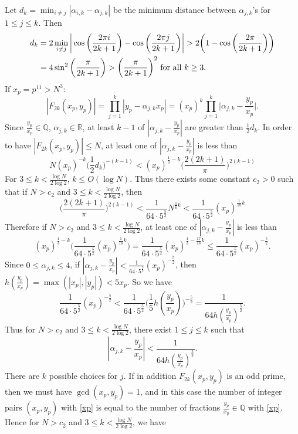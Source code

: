 \documentclass[12pt]{amsart}
\numberwithin{equation}{section}
\begin{document}
Let $d_k=\min_{i\neq j}|\alpha_{i,k}-\alpha_{j,k}|$ be the minimum distance between $\alpha_{j,k}$'s for $1\leq j\leq k$. Then \begin{displaymath}
\begin{split}
d_k&=2\min_{i\neq j}\bigg|\cos{\bigg(\frac{2\pi i}{2k+1}\bigg)}-\cos{\bigg(\frac{2\pi j}{2k+1}\bigg)}\bigg|>2\bigg(1-\cos{\bigg(\frac{2\pi}{2k+1}\bigg)}\bigg)\\&=4\sin^2{\bigg(\frac{\pi}{2k+1}\bigg)}>\bigg(\frac{\pi}{2k+1}\bigg)^2 \textup{ for all }k\geq 3.
\end{split}
\end{displaymath}
If $x_p=p^{11}>N^3$: $$|F_{2k}(x_p,y_p)|=\prod_{j=1}^k|y_p-\alpha_{j,k}x_p|=(x_p)^k\prod_{j=1}^k\bigg|\alpha_{j,k}-\frac{y_p}{x_p}\bigg|.$$
Since $\frac{y_p}{x_p}\in\mathbb{Q}$, $\alpha_{j,k}\in\mathbb{R}$, at least $k-1$ of $|\alpha_{j,k}-\frac{y_p}{x_p}|$ are greater than $\frac{1}{2}d_k$. In order to have $|F_{2k}(x_p,y_p)|\leq N$, at least one of $|\alpha_{j,k}-\frac{y_p}{x_p}|$ is less than $$N(x_p)^{-k}\bigg(\frac{1}{2}d_k\bigg)^{-(k-1)}<(x_p)^{\frac{1}{3}-k}\bigg(\frac{2(2k+1)}{\pi}\bigg)^{2(k-1)}$$
For $3\leq k<\frac{\log N}{2\log 2}$, $k\leq O(\log N)$. Thus there exists some constant $c_2>0$ such that if $N>c_2$ and $3\leq k < \frac{\log N}{2\log 2}$, then $$\bigg(\frac{2(2k+1)}{\pi}\bigg)^{2(k-1)}<\frac{1}{64\cdot5^{\frac{5}{2}}}N^{\frac{1}{6}k}<\frac{1}{64\cdot5^{\frac{5}{2}}}(x_p)^{\frac{1}{18}k}$$ 
Therefore if $N>c_2$ and $3\leq k < \frac{\log N}{2\log 2}$, at least one of $|\alpha_{j,k}-\frac{y_p}{x_p}|$ is less than $$(x_p)^{\frac{1}{3}-k}\bigg(\frac{1}{64\cdot5^{\frac{5}{2}}}(x_p)^{\frac{1}{18}k}\bigg)=\frac{1}{64\cdot5^{\frac{5}{2}}}(x_p)^{\frac{1}{3}-\frac{17}{18}k}\leq\frac{1}{64\cdot5^{\frac{5}{2}}}(x_p)^{-\frac{5}{2}}.$$
Since $0\leq \alpha_{j,k}\leq 4$, if $|\alpha_{j,k}-\frac{y_p}{x_p}|<\frac{1}{64\cdot5^{\frac{5}{2}}}(x_p)^{-\frac{5}{2}}$, then $h(\frac{y_p}{x_p})=\max(|x_p|,|y_p|)<5x_p$.  So we have $$\frac{1}{64\cdot5^{\frac{5}{2}}}(x_p)^{-\frac{5}{2}}<\frac{1}{64\cdot5^{\frac{5}{2}}}\bigg(\frac{1}{5}h(\frac{y_p}{x_p})\bigg)^{-\frac{5}{2}}=\frac{1}{64h(\frac{y_p}{x_p})^\frac{5}{2}}.$$
Thus for $N>c_2$ and $3\leq k<\frac{\log N}{2\log 2}$, there exist $1\leq j\leq k$ such that \begin{equation}\label{xp}
    |\alpha_{j,k}-\frac{y_p}{x_p}|<\frac{1}{64h(\frac{y_p}{x_p})^\frac{5}{2}}.
\end{equation} There are $k$ possible choices for $j$. If in addition $F_{2k}(x_p,y_p)$ is an odd prime, then we must have $\gcd(x_p,y_p)=1$, and in this case the number of integer pairs $(x_p,y_p)$ with \eqref{xp} is equal to the number of fractions $\frac{y_p}{x_p}\in\mathbb{Q}$ with \eqref{xp}. Hence for $N>c_2$ and $3\leq k<\frac{\log N}{2\log 2}$, we have 
\end{document}
